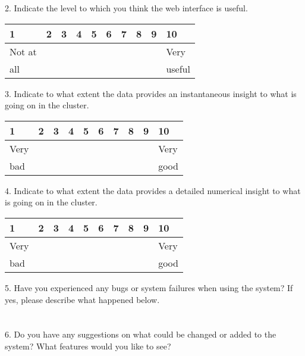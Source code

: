 \documentclass[12pt]{article}
\begin{document}
2. Indicate the level to which you think the web interface is useful.
\vspace{-5ex}
\begin{center}
\begin{tabular}{
|m{3em}|m{3em}|m{3em}|m{3em}|m{3em}|m{3em}|m{3em}|m{3em}|m{3em}|m{3em}| }
\hline
 1 & 2 & 3 & 4 & 5 & 6 & 7 & 8 & 9 & 10 \\ 
 \hline
 Not at &&&&&&&&& Very\\
 all &&&&&&&&& useful\\
  \hline
\end{tabular}
\end{center}

3. Indicate to what extent the data provides an instantaneous insight to what is going on in the cluster.
\vspace{-5ex}
\begin{center}
\begin{tabular}{
|m{3em}|m{3em}|m{3em}|m{3em}|m{3em}|m{3em}|m{3em}|m{3em}|m{3em}|m{3em}| }
\hline
 1 & 2 & 3 & 4 & 5 & 6 & 7 & 8 & 9 & 10 \\ 
 \hline
 Very &&&&&&&&& Very\\
 bad &&&&&&&&& good\\
  \hline
\end{tabular}
\end{center}

4. Indicate to what extent the data provides a detailed numerical insight to what is going on in the cluster.
\vspace{-5ex}
\begin{center}
\begin{tabular}{
|m{3em}|m{3em}|m{3em}|m{3em}|m{3em}|m{3em}|m{3em}|m{3em}|m{3em}|m{3em}| }
\hline
 1 & 2 & 3 & 4 & 5 & 6 & 7 & 8 & 9 & 10 \\ 
 \hline
 Very &&&&&&&&& Very\\
 bad &&&&&&&&& good\\
  \hline
\end{tabular}
\end{center}

5. Have you experienced any bugs or system failures when using the system? If yes, please describe what happened below.\\\\\\

6. Do you have any suggestions on what could be changed or added to the system? What features would you like to see?\\\\\\
\end{document}

